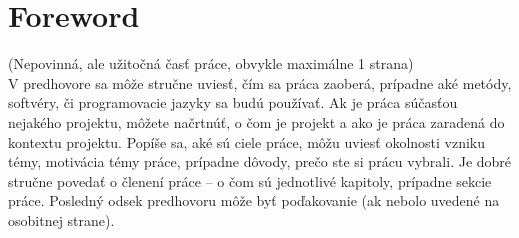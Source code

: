 \thispagestyle{empty}

\chapter*{Foreword}

(Nepovinná, ale užitočná časť práce, obvykle maximálne 1 strana)\\

V predhovore sa môže stručne uviesť, čím sa práca zaoberá, prípadne aké metódy, softvéry, či programovacie jazyky sa budú používať. Ak je práca súčasťou nejakého projektu, môžete načrtnúť, o čom je projekt a ako je práca zaradená do kontextu projektu. Popíše sa, aké sú ciele práce, môžu uviesť okolnosti vzniku témy, motivácia témy práce, prípadne dôvody, prečo ste si prácu vybrali. Je dobré stručne povedať o členení práce -- o čom sú jednotlivé kapitoly, prípadne sekcie práce. Posledný odsek predhovoru môže byť poďakovanie (ak nebolo uvedené na osobitnej strane).

\cleardoublepage

